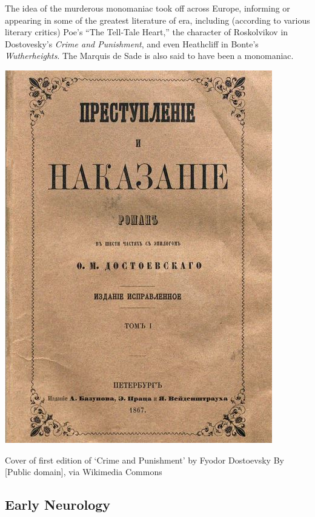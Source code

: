 \begin{refsection}
The idea of the murderous monomaniac took off across Europe, informing or appearing in some of the greatest literature of era, including (according to various literary critics) Poe's “The Tell-Tale Heart,” the character of Roskolvikov in Dostovesky's \emph{Crime and Punishment}, and even Heathcliff in Bonte's \emph{Wutherheights}. The Marquis de Sade is also said to have been a monomaniac.
\begin{marginfigure}
 \begin{center}

     \includegraphics[scale=0.25]{../images/crimenandpunishment.jpg}
\end{center}
 \caption{Cover of first edition of ‘Crime and Punishment’ by Fyodor Dostoevsky By [Public domain], via Wikimedia Commons }
\label{fig: crimeandpunishment}
\end{marginfigure}
 

\subsection{Early Neurology}
\label{earlyneurology}


\end{refsection}
